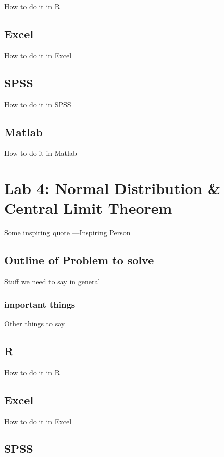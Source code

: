 \documentclass[]{book}
\theoremstyle{definition}
\theoremstyle{definition}
\theoremstyle{definition}
\theoremstyle{remark}
\begin{document}
How to do it in R

\section{Excel}\label{excel-2}

How to do it in Excel

\section{SPSS}\label{spss-2}

How to do it in SPSS

\section{Matlab}\label{matlab-2}

How to do it in Matlab

\chapter{Lab 4: Normal Distribution \& Central Limit
Theorem}\label{lab-4-normal-distribution-central-limit-theorem}

{ Some inspiring quote ---Inspiring Person }

\section{Outline of Problem to
solve}\label{outline-of-problem-to-solve-2}

Stuff we need to say in general

\subsection{important things}\label{important-things-2}

Other things to say

\section{R}\label{r-4}

How to do it in R

\section{Excel}\label{excel-3}

How to do it in Excel

\section{SPSS}\label{spss-3}
\end{document}
